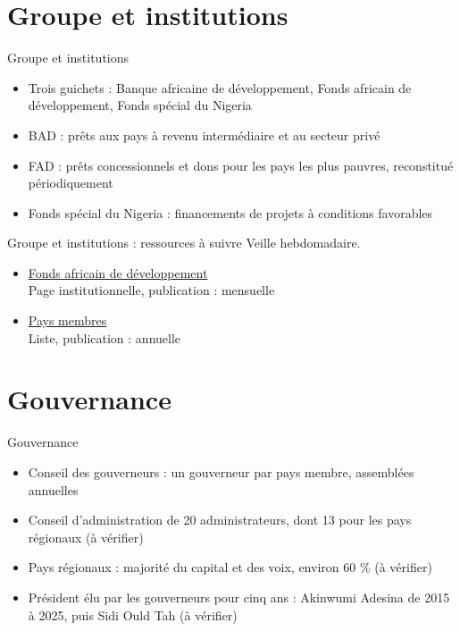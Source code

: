 \documentclass[aspectratio=169,11pt]{beamer}
\begin{document}
\section{Groupe et institutions}
\begin{frame}{Groupe et institutions}
\begin{itemize}
\item Trois guichets : Banque africaine de développement, Fonds africain de développement, Fonds spécial du Nigeria
\item BAD : prêts aux pays à revenu intermédiaire et au secteur privé
\item FAD : prêts concessionnels et dons pour les pays les plus pauvres, reconstitué périodiquement
\item Fonds spécial du Nigeria : financements de projets à conditions favorables
\end{itemize}
\end{frame}

\begin{frame}{Groupe et institutions : ressources à suivre}
\small
Veille hebdomadaire.
\begin{itemize}
\item \href{https://www.afdb.org/en/about-us/african-development-fund}{Fonds africain de développement}\\{\footnotesize Page institutionnelle, publication : mensuelle}
\item \href{https://www.afdb.org/en/about-us/corporate-information/members}{Pays membres}\\{\footnotesize Liste, publication : annuelle}
\end{itemize}
\end{frame}

\section{Gouvernance}
\begin{frame}{Gouvernance}
\begin{itemize}
\item Conseil des gouverneurs : un gouverneur par pays membre, assemblées annuelles
\item Conseil d'administration de 20 administrateurs, dont 13 pour les pays régionaux (à vérifier)
\item Pays régionaux : majorité du capital et des voix, environ 60 \% (à vérifier)
\item Président élu par les gouverneurs pour cinq ans : Akinwumi Adesina de 2015 à 2025, puis Sidi Ould Tah (à vérifier)
\end{itemize}
\end{frame}
\end{document}

